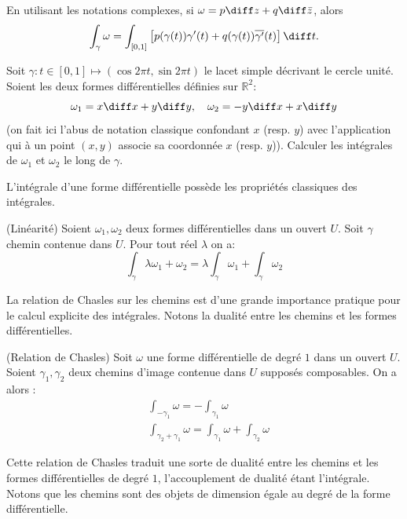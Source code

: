 En utilisant les notations complexes, si $\omega=p \diff z + q \diff \bar{z}$, alors 
\[\int_{\gamma} \omega =\int_{[0,1]} \left[ p(\gamma(t)) \gamma^\prime(t) + q(\gamma(t)) \overline{\gamma^\prime}(t)\right] \diff t.\]
\begin{exercice}
Soit $\gamma \colon t \in [0,1] \mapsto (\cos 2 \pi t, \sin 2 \pi t)$ le lacet
simple décrivant le cercle unité. Soient les deux formes différentielles
définies sur $\mathbb{R}^2$:
\[
\omega_1 =  x \diff x + y \diff y, \quad \omega_2 = -y \diff  x + x \diff y
\]
(on fait ici l'abus de notation classique confondant $x$ (resp. $y$) avec
l'application qui à un point $(x,y)$ associe sa coordonnée $x$ (resp. $y$)).
Calculer les intégrales de $\omega_1$ et $\omega_2$ le long de $\gamma$.
\end{exercice}
L'intégrale d'une forme différentielle possède les propriétés classiques des
intégrales.

\begin{fprop}{(Linéarité)}
Soient $\omega_1, \omega_2$ deux formes différentielles dans un ouvert
$U$. Soit $\gamma$ chemin contenue dans $U$. Pour tout réel
$\lambda$ on a:
\[
\int_\gamma \lambda \omega_1 + \omega_2 = \lambda \int_\gamma \omega_1 +
\int_\gamma \omega_2
\]
\end{fprop}

La relation de Chasles sur les chemins est d'une grande importance pratique pour
le calcul explicite des intégrales. Notons la dualité entre les chemins et les formes différentielles.

\begin{fprop}{(Relation de Chasles)}
Soit $\omega$ une forme différentielle de degré $1$ dans un ouvert $U$. Soient $\gamma_1,\gamma_2$ deux chemins d'image contenue dans $U$ supposés composables. On a alors :
\begin{align*}
& \int_{- \gamma_1} \omega = - \int_{\gamma_1} \omega \\
& \int_{\gamma_2 + \gamma_1} \omega = \int_{\gamma_1} \omega + \int_{\gamma_2}
\omega
\end{align*}
\end{fprop}

Cette relation de Chasles traduit une sorte de dualité entre les chemins et les formes différentielles de degré $1$, l'accouplement de dualité étant l'intégrale. Notons que les chemins sont des objets de dimension égale au degré de la forme différentielle. 

